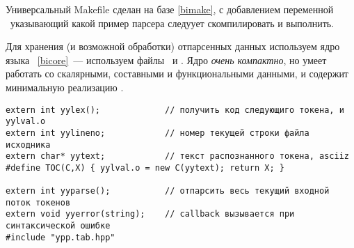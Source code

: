 \label{syntax}\secdown

\label{lexmake}

Универсальный Makefile сделан на базе \ref{bimake}, с добавлением переменной
\ указывающий какой пример парсера следуует скомпилировать и выполнить.

Для хранения (и возможной обработки) отпарсенных данных используем ядро языка
\bi\ \ref{bicore}\ --- используем файлы \ и
. Ядро \emph{очень компактно}, но умеет работать со
скалярными, составными и функциональными данными, и содержит минимальную
реализацию .


\label{lexinterface}

\begin{verbatim}
extern int yylex();             // получить код следующиго токена, и yylval.o 
extern int yylineno;            // номер текущей строки файла исходника
extern char* yytext;            // текст распознанного токена, asciiz
#define TOC(C,X) { yylval.o = new C(yytext); return X; }

extern int yyparse();           // отпарсить весь текущий входной поток токенов
extern void yyerror(string);    // callback вызывается при синтаксической ошибке
#include "ypp.tab.hpp"
\end{verbatim}









\secup